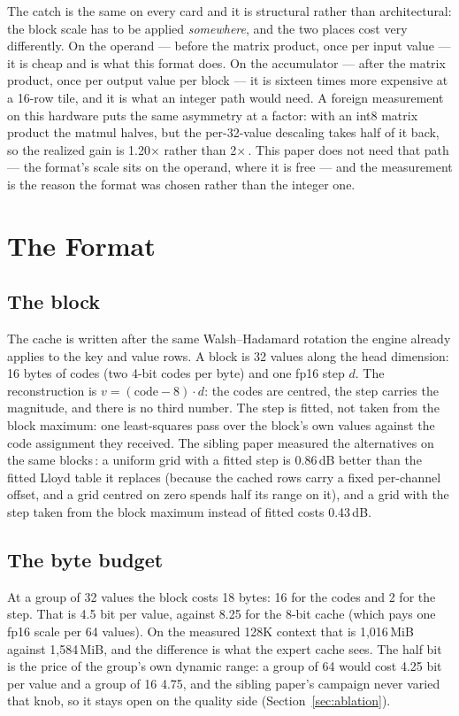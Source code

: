 \documentclass[10pt,twocolumn]{article}
\begin{document}
The catch is the same on every card and it is structural rather than architectural: the block scale has to
be applied \emph{somewhere}, and the two places cost very differently. On the operand --- before the
matrix product, once per input value --- it is cheap and is what this format does. On the accumulator ---
after the matrix product, once per output value per block --- it is sixteen times more expensive at a
16-row tile, and it is what an integer path would need. A foreign measurement on this hardware puts the
same asymmetry at a factor: with an int8 matrix product the matmul halves, but the per-32-value
descaling takes half of it back, so the realized gain is 1.20$\times$ rather than 2$\times$\,\cite{zincwmma}.
This paper does not need that path --- the format's scale sits on the operand, where it is free --- and the
measurement is the reason the format was chosen rather than the integer one.


\section{The Format}
\label{sec:format}

\subsection{The block}

The cache is written after the same Walsh--Hadamard rotation the engine already applies to the key and
value rows. A block is 32 values along the head dimension: 16 bytes of codes (two 4-bit codes per byte) and
one fp16 step $d$. The reconstruction is $v = (\text{code}-8)\cdot d$: the codes are centred, the step
carries the magnitude, and there is no third number. The step is fitted, not taken from the block maximum:
one least-squares pass over the block's own values against the code assignment they received. The sibling
paper measured the alternatives on the same blocks\,\cite{shear}: a uniform grid with a fitted step is
0.86\,dB better than the fitted Lloyd table it replaces (because the cached rows carry a fixed per-channel
offset, and a grid centred on zero spends half its range on it), and a grid with the step taken from the
block maximum instead of fitted costs 0.43\,dB.

\subsection{The byte budget}

At a group of 32 values the block costs 18 bytes: 16 for the codes and 2 for the step. That is 4.5 bit per
value, against 8.25 for the 8-bit cache (which pays one fp16 scale per 64 values). On the measured 128K
context that is 1,016\,MiB against 1,584\,MiB, and the difference is what the expert cache sees. The half
bit is the price of the group's own dynamic range: a group of 64 would cost 4.25 bit per value and a group
of 16 4.75, and the sibling paper's campaign never varied that knob, so it stays open on the quality side
(Section~\ref{sec:ablation}).
\end{document}
